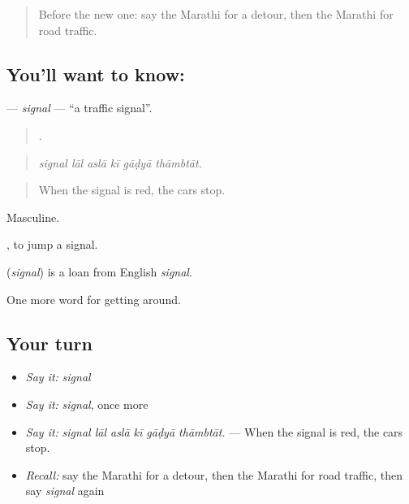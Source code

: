 \label{lesson:MR-C404-signal}



\begin{quote}
Before the new one: say the Marathi for a detour, then the Marathi for road traffic.
\end{quote}

\subsection*{You'll want to know: }
\textbf{} — \emph{signal} — \textquotedblleft{}a traffic signal\textquotedblright{}.

\begin{quote}
     .
\end{quote}

\begin{quote}
\emph{signal lāl aslā kī gāḍyā thāmbtāt.}
\end{quote}

\begin{quote}
When the signal is red, the cars stop.
\end{quote}

Masculine.

 , to jump a signal.

\begin{cousinweb}
\textbf{} (\emph{signal}) is a loan from English \emph{signal}.
\end{cousinweb}

\begin{grammarlens}[title={What you've built}]
One more word for getting around.
\end{grammarlens}

\subsection*{Your turn}
\begin{itemize}
\raggedright
  \item \emph{Say it:} \emph{signal}
  \item \emph{Say it:} \emph{signal}, once more
  \item \emph{Say it:} \emph{signal lāl aslā kī gāḍyā thāmbtāt.} — When the signal is red, the cars stop.
  \item \emph{Recall:} say the Marathi for a detour, then the Marathi for road traffic, then say \emph{signal} again
\end{itemize}

